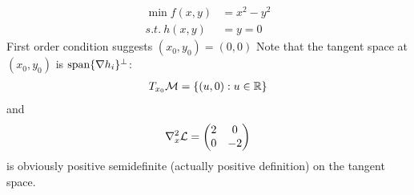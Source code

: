 \documentclass{article}
\begin{document}
   	\begin{example}
   		\begin{align}
   			\min f(x, y) &= x^2 - y^2 \\
   			s.t.\ h(x, y) &= y = 0
   		\end{align}
   		First order condition suggests $(x_0, y_0) = (0, 0)$ Note that the tangent space at $(x_0, y_0)$ is $\text{{span}}\{\nabla h_i\}^\perp$:
   		\begin{align}
   			T_{x_0}\mathcal{{M}} = \{ (u, 0): u \in \mathbb{R}\}
   		\end{align}
   		and 
   		\begin{align}
   			\nabla_x^2 \mathcal{{L}} = \begin{pmatrix}
   				2 & 0 \\ 0 & -2
   			\end{pmatrix}
   		\end{align}
   		is obviously positive semidefinite (actually positive definition) on the tangent space.
   	\end{example}
   	
\end{document}
